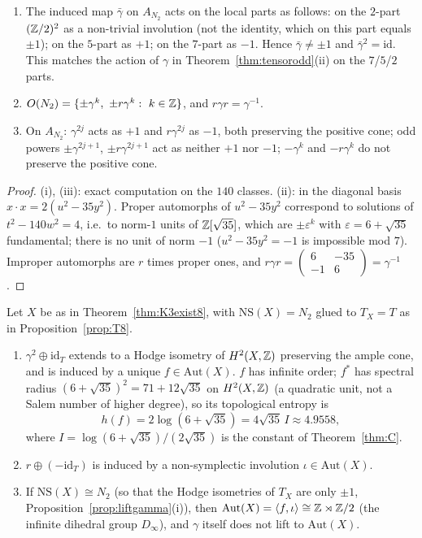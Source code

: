 \begin{proposition}\label{prop:gamma8}
\begin{enumerate}[label=(\roman*)]
\item The induced map $\bar\gamma$ on $A_{N_2}$ acts on the local parts as follows: on the $2$-part $(\mathbb{Z}/2)^2$ as a non-trivial involution (not the identity, which on this part equals $\pm1$); on the $5$-part as $+1$; on the $7$-part as $-1$. Hence $\bar\gamma\neq\pm1$ and $\bar\gamma^2=\mathrm{id}$. This matches the action of $\gamma$ in Theorem~\ref{thm:tensorodd}(ii) on the $7$/$5$/$2$ parts.
\item $O(N_2)=\{\pm\gamma^k,\ \pm r\gamma^k:\ k\in\Z\}$, and $r\gamma r=\gamma^{-1}$.
\item On $A_{N_2}$: $\gamma^{2j}$ acts as $+1$ and $r\gamma^{2j}$ as $-1$, both preserving the positive cone; odd powers $\pm\gamma^{2j+1}$, $\pm r\gamma^{2j+1}$ act as neither $+1$ nor $-1$; $-\gamma^{k}$ and $-r\gamma^k$ do not preserve the positive cone.
\end{enumerate}
\end{proposition}
\begin{proof}
(i), (iii): exact computation on the $140$ classes. (ii): in the diagonal basis $x\cdot x=2(u^2-35y^2)$. Proper automorphs of $u^2-35y^2$ correspond to solutions of $t^2-140w^2=4$, i.e.\ to norm-$1$ units of $\mathbb{Z}[\sqrt{35}]$, which are $\pm\varepsilon^k$ with $\varepsilon=6+\sqrt{35}$ fundamental; there is no unit of norm $-1$ ($u^2-35y^2=-1$ is impossible mod $7$). Improper automorphs are $r$ times proper ones, and $r\gamma r=\left(\begin{smallmatrix}6&-35\\-1&6\end{smallmatrix}\right)=\gamma^{-1}$.
\end{proof}
\begin{theorem}\label{thm:aut8}
Let $X$ be as in Theorem~\ref{thm:K3exist8}, with $\mathrm{NS}(X)=N_2$ glued to $T_X=T$ as in Proposition~\ref{prop:T8}.
\begin{enumerate}[label=(\roman*)]
\item $\gamma^2\oplus\mathrm{id}_{T}$ extends to a Hodge isometry of $H^2(X,\mathbb{Z})$ preserving the ample cone, and is induced by a unique $f\in\mathrm{Aut}(X)$. $f$ has infinite order; $f^*$ has spectral radius $(6+\sqrt{35})^2=71+12\sqrt{35}$ on $H^2(X,\mathbb{Z})$ (a quadratic unit, not a Salem number of higher degree), so its topological entropy is
\[
h(f)=2\log(6+\sqrt{35})=4\sqrt{35}\,I\approx4.9558,
\]
where $I=\log(6+\sqrt{35})/(2\sqrt{35})$ is the constant of Theorem~\ref{thm:C}.
\item $r\oplus(-\mathrm{id}_T)$ is induced by a non-symplectic involution $\iota\in\mathrm{Aut}(X)$.
\item If $\mathrm{NS}(X)\cong N_2$ (so that the Hodge isometries of $T_X$ are only $\pm1$, Proposition~\ref{prop:liftgamma}(i)), then $\mathrm{Aut}(X)=\langle f,\iota\rangle\cong\mathbb{Z}\rtimes\mathbb{Z}/2$ (the infinite dihedral group $D_\infty$), and $\gamma$ itself does not lift to $\mathrm{Aut}(X)$.
\end{enumerate}
\end{theorem}
